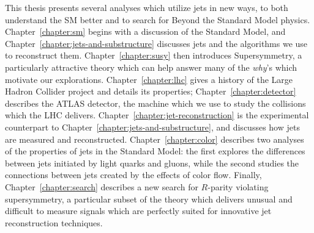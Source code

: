 

This thesis presents several analyses which utilize jets in new ways, to both understand the SM better and to search for Beyond the Standard Model physics.  Chapter~\ref{chapter:sm} begins with a discussion of the Standard Model, and Chapter~\ref{chapter:jets-and-substructure} discusses jets and the algorithms we use to reconstruct them. Chapter~\ref{chapter:susy} then introduces Supersymmetry, a particularly attractive theory which can help answer many of the \textit{why}'s which motivate our explorations. Chapter~\ref{chapter:lhc} gives a history of the Large Hadron Collider project and details its properties; Chapter~\ref{chapter:detector} describes the ATLAS detector, the machine which we use to study the collisions which the LHC delivers. Chapter~\ref{chapter:jet-reconstruction} is the experimental counterpart to Chapter~\ref{chapter:jets-and-substructure}, and discusses how jets are measured and reconstructed. Chapter~\ref{chapter:color} describes two analyses of the properties of jets in the Standard Model: the first explores the differences between jets initiated by light quarks and gluons, while the second studies the connections between jets created by the effects of color flow. Finally, Chapter~\ref{chapter:search} describes a new search for $R$-parity violating supersymmetry, a particular subset of the theory which delivers unusual and difficult to measure signals which are perfectly suited for innovative jet reconstruction techniques.